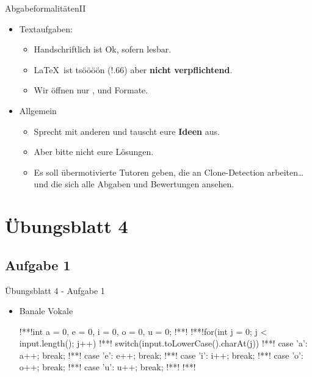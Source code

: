 \begin{frame}[c]{Abgabeformalitäten\hfill II}
\begin{itemize}[<+(1)->]
    \itemsep=13pt
    \item Textaufgaben:
    \begin{itemize}
        \item Handschriftlich ist Ok, sofern lesbar.
        \item \LaTeX\ ist tsöööön (\resizebox*!{.66\baselineskip}{}) aber \textbf{nicht verpflichtend}.
        \item Wir öffnen nur ,  und  Formate.
    \end{itemize}
    \item Allgemein
    \begin{itemize}
        \item Sprecht mit anderen und tauscht eure \textbf{Ideen} aus.
        \item Aber bitte nicht eure Lösungen.
        \item Es soll übermotivierte Tutoren geben, die an Clone-Detection arbeiten\ldots\\
        und die sich alle Abgaben und Bewertungen ansehen.
    \end{itemize}
\end{itemize}
\end{frame}

\section{Übungsblatt 4}
\subsection{Aufgabe 1}
\begin{frame}[fragile]{Übungsblatt 4 - Aufgabe 1}
    \begin{itemize}[<+(1)->]
        \item Banale Vokale 
\begin{plainjava}
!**!int a = 0, e = 0, i = 0, o = 0, u = 0;
!**!
!**!for(int j = 0; j < input.length(); j++) {
!**!    switch(input.toLowerCase().charAt(j)) {
!**!        case 'a': a++; break;
!**!        case 'e': e++; break;
!**!        case 'i': i++; break;
!**!        case 'o': o++; break;
!**!        case 'u': u++; break;
!**!    }
!**!}
\end{plainjava}
    \end{itemize}
\end{frame}

